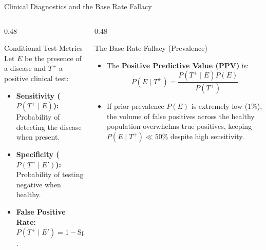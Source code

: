 \documentclass[10pt, aspectratio=169]{beamer}
\begin{document}
\begin{frame}{Clinical Diagnostics and the Base Rate Fallacy}
  \begin{columns}[T]
    \begin{column}{0.48\textwidth}
      \begin{block}{Conditional Test Metrics}
        \small
        Let $E$ be the presence of a disease and $T^+$ a positive clinical test:
        \begin{itemize}\itemsep=0.1cm
          \item \textbf{Sensitivity ($P(T^+ \mid E)$):} Probability of detecting the disease when present.
          \item \textbf{Specificity ($P(T^- \mid E')$):} Probability of testing negative when healthy.
          \item \textbf{False Positive Rate:} $P(T^+ \mid E') = 1 - \text{Specificity}$.
        \end{itemize}
      \end{block}
    \end{column}
    \begin{column}{0.48\textwidth}
      \begin{alertblock}{The Base Rate Fallacy (Prevalence)}
        \small
        \begin{itemize}\itemsep=0.1cm
          \item The \textbf{Positive Predictive Value (PPV)} is:
          $$P(E \mid T^+) = \frac{P(T^+ \mid E)P(E)}{P(T^+)}$$
          \item If prior prevalence $P(E)$ is extremely low ($1\%$), the volume of false positives across the healthy population overwhelms true positives, keeping $P(E \mid T^+) \ll 50\%$ despite high sensitivity.
        \end{itemize}
      \end{alertblock}
    \end{column}
  \end{columns}
\end{frame}
\end{document}
